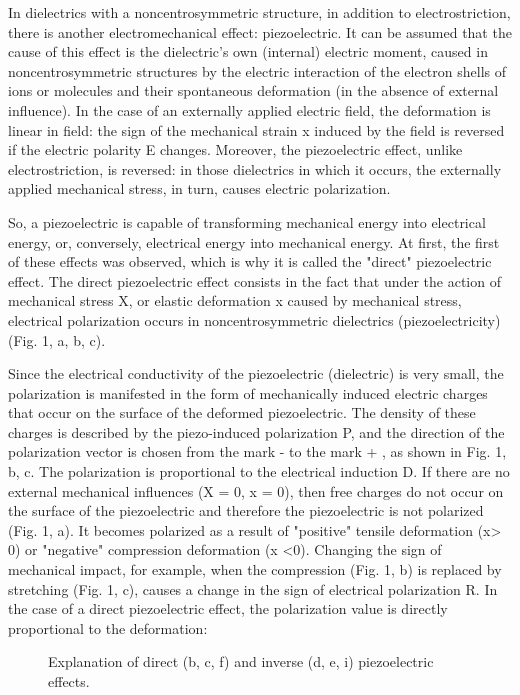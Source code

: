 \documentclass[a4paper,14pt]{extreport}
\begin{document}
In dielectrics with a noncentrosymmetric structure, in addition to electrostriction, there is another electromechanical effect: piezoelectric. It can be assumed that the cause of this effect is the dielectric's own (internal) electric moment, caused in noncentrosymmetric structures by the electric interaction of the electron shells of ions or molecules and their spontaneous deformation (in the absence of external influence). In the case of an externally applied electric field, the deformation is linear in field: the sign of the mechanical strain x induced by the field is reversed if the electric polarity E changes. Moreover, the piezoelectric effect, unlike electrostriction, is reversed: in those dielectrics in which it occurs, the externally applied mechanical stress, in turn, causes electric polarization.\par
So, a piezoelectric is capable of transforming mechanical energy into electrical energy, or, conversely, electrical energy into mechanical energy. At first, the first of these effects was observed, which is why it is called the "direct" piezoelectric effect.
The direct piezoelectric effect consists in the fact that under the action of mechanical stress X, or elastic deformation x caused by mechanical stress, electrical polarization occurs in noncentrosymmetric dielectrics (piezoelectricity) (Fig. 1, a, b, c).\par
Since the electrical conductivity of the piezoelectric (dielectric) is very small, the polarization is manifested in the form of mechanically induced electric charges that occur on the surface of the deformed piezoelectric. The density of these charges is described by the piezo-induced polarization P, and the direction of the polarization vector is chosen from the mark - to the mark + , as shown in Fig. 1, b, c. The polarization is proportional to the electrical induction D.
If there are no external mechanical influences (X = 0, x = 0), then free charges do not occur on the surface of the piezoelectric and therefore the piezoelectric is not polarized (Fig. 1, a). It becomes polarized as a result of "positive" tensile deformation (x> 0) or "negative" compression deformation (x <0). Changing the sign of mechanical impact, for example, when the compression (Fig. 1, b) is replaced by stretching (Fig. 1, c), causes a change in the sign of electrical polarization R. In the case of a direct piezoelectric effect, the polarization value is directly proportional to the deformation:



\begin{figure}[h]
\caption{Explanation of direct (b, c, f) and inverse (d, e, i) piezoelectric effects.}
\label{ris1}
\end{figure}
\end{document}
